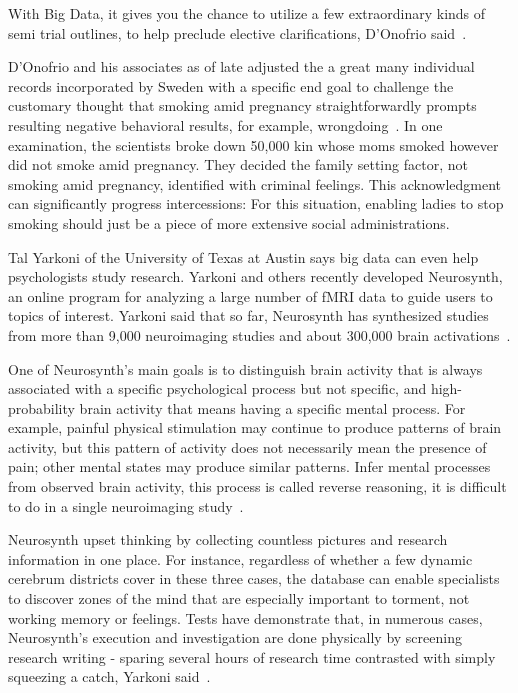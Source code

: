 With Big Data, it gives you the chance to utilize a few 
extraordinary 
kinds of semi trial outlines, to help preclude elective 
clarifications, D'Onofrio said~\cite{hid515-00}.

D'Onofrio and his associates as of late adjusted the a great many 
individual records incorporated by Sweden with a specific end goal 
to challenge the customary 
thought that smoking amid pregnancy straightforwardly prompts 
resulting negative 
behavioral results, for example, wrongdoing~\cite{hid515-00}. 
In one examination, the scientists broke down 
50,000 kin whose moms smoked however did not smoke amid pregnancy. 
They decided the family setting factor, not smoking amid pregnancy,
identified with criminal feelings. This acknowledgment can 
significantly progress intercessions: 
For this situation, enabling ladies to stop smoking should just be
 a piece of more extensive social administrations.

Tal Yarkoni of the University of Texas at Austin says big data can 
even help psychologists study research. Yarkoni and others recently 
developed Neurosynth, an online program for analyzing a large number 
of fMRI data to guide users to topics of interest. Yarkoni said that 
so far, Neurosynth has synthesized studies from more than 9,000 
neuroimaging studies and about 300,000 brain activations~\cite{hid515-00}.

One of Neurosynth's main goals is to distinguish brain activity that 
is always associated with a specific psychological process but not 
specific, and high-probability brain activity that means having a 
specific mental process. For example, painful physical stimulation 
may continue to produce patterns of brain activity, but this 
pattern 
of activity does not necessarily mean the presence of pain; other 
mental states may produce similar patterns. Infer mental processes 
from observed brain activity, this process is called reverse 
reasoning, it is difficult to do in a single neuroimaging 
study~\cite{hid515-00}.

Neurosynth upset thinking by collecting countless 
pictures and research information in one place. For instance, 
regardless of whether a few 
dynamic cerebrum districts cover in these three cases, the database
 can enable specialists to discover zones of the mind that are 
especially important 
to torment, not working memory or feelings. Tests have demonstrate
 that, in numerous 
cases, Neurosynth's execution and investigation are done physically
 by screening research writing - sparing several hours of research 
time contrasted with simply squeezing a catch, Yarkoni 
said~\cite{hid515-00}.


